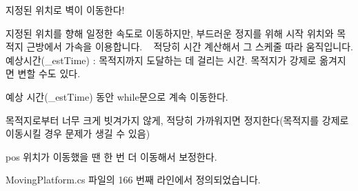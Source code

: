 지정된 위치로 벽이 이동한다! 

지정된 위치를 향해 일정한 속도로 이동하지만, 부드러운 정지를 위해 시작 위치와 목적지 근방에서 가속을 이용합니다. ~\newline
적당히 시간 계산해서 그 스케줄 따라 움직입니다. 예상시간(\+\_\+est\+Time) \+: 목적지까지 도달하는 데 걸리는 시간. 목적지가 강제로 옮겨지면 변할 수도 있다.

예상 시간(\+\_\+est\+Time) 동안 while문으로 계속 이동한다.

목적지로부터 너무 크게 빗겨가지 않게, 적당히 가까워지면 정지한다(목적지를 강제로 이동시킬 경우 문제가 생길 수 있음)

pos 위치가 이동했을 땐 한 번 더 이동해서 보정한다. 

Moving\+Platform.\+cs 파일의 166 번째 라인에서 정의되었습니다.



